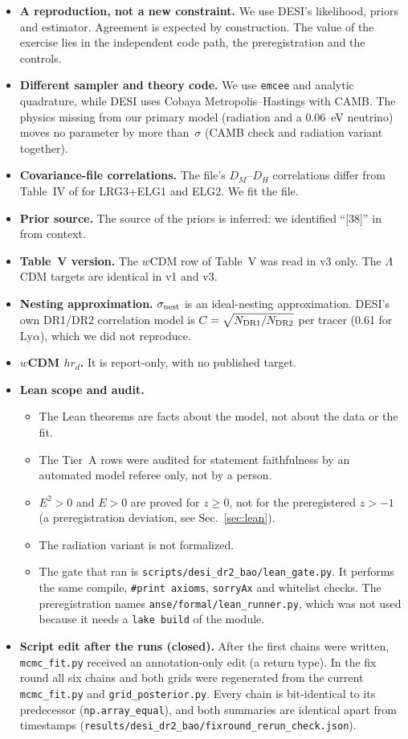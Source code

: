 \documentclass[11pt]{article}
\begin{document}
\begin{itemize}
\item \textbf{A reproduction, not a new constraint.} We use DESI's
likelihood, priors and estimator. Agreement is expected by construction. The
value of the exercise lies in the independent code path, the preregistration
and the controls.
\item \textbf{Different sampler and theory code.} We use \texttt{emcee} and
analytic quadrature, while DESI uses Cobaya Metropolis--Hastings with CAMB.
The physics missing from our primary model (radiation and a 0.06~eV
neutrino) moves no parameter by more than \SystMaxShift\,$\sigma$ (CAMB
check and radiation variant together).
\item \textbf{Covariance-file correlations.} The file's $D_M$--$D_H$
correlations differ from Table~IV of \cite{desi2025dr2} for LRG3+ELG1 and
ELG2. We fit the file.
\item \textbf{Prior source.} The source of the priors is inferred: we
identified ``[38]'' in \cite{desi2025dr2} from context.
\item \textbf{Table~V version.} The $w$CDM row of Table~V was read in v3
only. The $\Lambda$CDM targets are identical in v1 and v3.
\item \textbf{Nesting approximation.} $\sigma_{\rm nest}$ is an
ideal-nesting approximation. DESI's own DR1/DR2 correlation model is
$C=\sqrt{N_{\rm DR1}/N_{\rm DR2}}$ per tracer (0.61 for Ly$\alpha$), which
we did not reproduce.
\item \textbf{$w$CDM $hr_d$.} It is report-only, with no published target.
\item \textbf{Lean scope and audit.}
  \begin{itemize}
  \item The Lean theorems are facts about the model, not about the data or
  the fit.
  \item The Tier~A rows were audited for statement faithfulness by an
  automated model referee only, not by a person.
  \item $E^2>0$ and $E>0$ are proved for $z\ge0$, not for the preregistered
  $z>-1$ (a preregistration deviation, see Sec.~\ref{sec:lean}).
  \item The radiation variant is not formalized.
  \item The gate that ran is \texttt{scripts/desi\_dr2\_bao/lean\_gate.py}.
  It performs the same compile, \texttt{\#print axioms}, \texttt{sorryAx}
  and whitelist checks. The preregistration names
  \texttt{anse/formal/lean\_runner.py}, which was not used because it needs
  a \texttt{lake build} of the module.
  \end{itemize}
\item \textbf{Script edit after the runs (closed).} After the first chains
were written, \texttt{mcmc\_fit.py} received an annotation-only edit (a
return type). In the fix round all six chains and both grids were
regenerated from the current \texttt{mcmc\_fit.py} and
\texttt{grid\_posterior.py}. Every chain is bit-identical to its
predecessor (\texttt{np.array\_equal}), and both summaries are identical
apart from timestamps (\texttt{results/desi\_dr2\_bao/fixround\_rerun\_check.json}).
\end{itemize}
\end{document}
